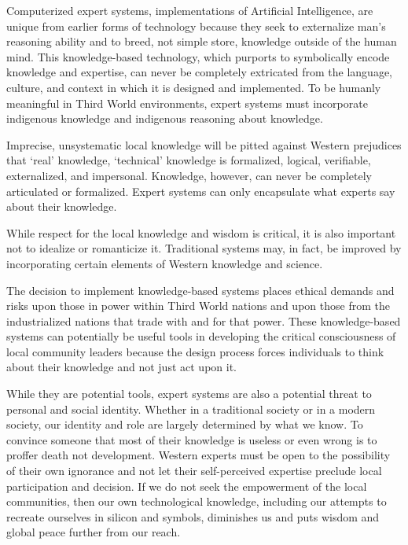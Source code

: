  Computerized expert systems, implementations of Artificial
   Intelligence, are unique from earlier forms of technology because
   they seek to externalize man's reasoning ability and to breed, not
   simple store, knowledge outside of the human mind.  This
   knowledge-based technology, which purports to symbolically encode
   knowledge and expertise, can never be completely extricated from the
   language, culture, and context in which it is designed and
   implemented.  To be humanly meaningful in Third World environments,
   expert systems must incorporate indigenous knowledge and indigenous
   reasoning about knowledge.

   Imprecise, unsystematic local knowledge will be pitted against
   Western prejudices that `real' knowledge, `technical' knowledge is
   formalized, logical, verifiable, externalized, and impersonal.
   Knowledge, however, can never be completely articulated or
   formalized.  Expert systems can only encapsulate what experts say
   about their knowledge.

   While respect for the local knowledge and wisdom is critical, it is
   also important not to idealize or romanticize it.  Traditional
   systems may, in fact, be improved by incorporating certain elements
   of Western knowledge and science.

   The decision to implement knowledge-based systems places ethical
   demands and risks upon those in power within Third World nations and
   upon those from the industrialized nations that trade with and for
   that power.  These knowledge-based systems can potentially be useful
   tools in developing the critical consciousness of local community
   leaders because the design process forces individuals to think about
   their knowledge and not just act upon it.

   While they are potential tools, expert systems are also a potential
   threat to personal and social identity.  Whether in a traditional
   society or in a modern society, our identity and role are largely
   determined by what we know.  To convince someone that most of their
   knowledge is useless or even wrong is to proffer death not
   development.  Western experts must be open to the possibility of
   their own ignorance and not let their self-perceived expertise
   preclude local participation and decision.  If we do not seek the
   empowerment of the local communities, then our own technological
   knowledge, including our attempts to recreate ourselves in silicon
   and symbols, diminishes us and puts wisdom and global peace further
   from our reach.


